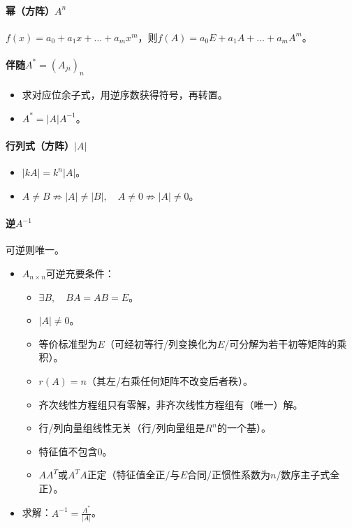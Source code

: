 \documentclass[
12pt, %
a4paper, 
oneside, %
]{scrartcl}
\begin{document}
\paragraph{幂（方阵）$ A^n $}
$ f(x) = a_0 + a_1 x + \dots + a_m x^m $，则$ f(A) = a_0 E + a_1 A + \dots + a_m A^m $。
\paragraph{伴随$ A^* = (A_{ji})_n $}
\begin{itemize}
\item 求对应位余子式，用逆序数获得符号，再转置。
\item $ A^* = |A| A^{-1} $。
\end{itemize}
\paragraph{行列式（方阵）$ |A| $}
\begin{itemize}
\item $ |kA| = k^n|A| $。
\item $ A \neq B \not\Rightarrow |A| \neq |B|,  \quad A \neq 0 \not\Rightarrow |A| \neq 0 $。
\end{itemize}
\paragraph{逆$ A^{-1} $}
可逆则唯一。
\begin{itemize}
\item $ A_{n \times n} $可逆充要条件：
\begin{itemize}
\item $ \exists B, \quad BA = AB = E $。
\item $ |A| \neq 0 $。
\item 等价标准型为$ E $（可经初等行/列变换化为$ E $/可分解为若干初等矩阵的乘积）。
\item $ r(A) = n $（其左/右乘任何矩阵不改变后者秩）。
\item 齐次线性方程组只有零解，非齐次线性方程组有（唯一）解。
\item 行/列向量组线性无关（行/列向量组是$ R^n $的一个基）。
\item 特征值不包含$ 0 $。
\item $ AA^T $或$ A^TA $正定（特征值全正/与$ E $合同/正惯性系数为$ n $/数序主子式全正）。 
\end{itemize}
\item 求解：$ A^{-1} = \frac{A^*}{|A|} $。
\end{itemize}
\end{document}
